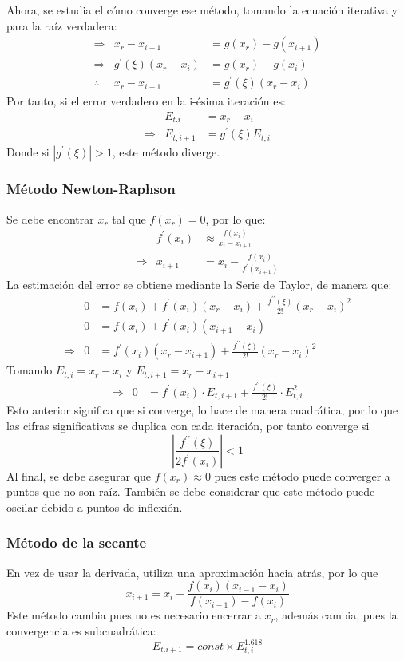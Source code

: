 \documentclass[letterpaper, 12pt, twoside]{article}
\begin{document}
	Ahora, se estudia el cómo converge ese método, tomando la ecuación iterativa y para la raíz verdadera:
	\begin{eqnarray*}
	\Rightarrow &x_r - x_{i+1} &= g(x_r)-g(x_{i+1})\\
	\Rightarrow &g^{\prime}(\xi)(x_r-x_i) &=g(x_r)-g(x_i) \\
	\therefore &x_r -x_{i+1} &= g^{\prime}(\xi)(x_r-x_i)
	\end{eqnarray*}
	Por tanto, si el error verdadero en la i-ésima iteración es:
	\begin{eqnarray*}
		& E_{t.i} &=  x_r-x_i\\
		\Rightarrow &E_{t,i+1} &=g^{\prime}(\xi)E_{t,i}
	\end{eqnarray*}
	Donde si $|g^{\prime}(\xi)|>1$, este método diverge.
	\subsubsection{Método Newton-Raphson}
	Se debe encontrar $x_r$ tal que $f(x_r)=0$, por lo que:
	\begin{eqnarray*}
		&f^{\prime}(x_i) &\approx \frac{f(x_i)}{x_i-x_{i+1}}\\
		\Rightarrow &x_{i+1} &= x_i - \frac{f(x_i)}{f^{\prime}(x_{i+1})}
	\end{eqnarray*}
	La estimación del error se obtiene mediante la Serie de Taylor, de manera que:
	\begin{eqnarray*}
		&0 &= f(x_i) + f^{\prime}(x_i)(x_r-x_i) + \frac{f^{\prime\prime}(\xi)}{2!}(x_r-x_i)^2\\
		&0 &= f(x_i) + f^{\prime}(x_i)(x_{i+1}-x_i)\\
		\Rightarrow &0 &= f^\prime(x_i)(x_r-x_{i+1})+ \frac{f^{\prime\prime}(\xi)}{2!}(x_r-x_i)^2
	\end{eqnarray*}
	Tomando $E_{t,i} = x_r-x_i$ y $E_{t,i+1}= x_r - x_{i+1}$
	\begin{eqnarray*}
		\Rightarrow &0 &= f^\prime(x_i)\cdot E_{t,i+1} + \frac{f^{\prime\prime}(\xi)}{2!}\cdot E_{t,i}^2
	\end{eqnarray*}
	Esto anterior significa que si converge, lo hace de manera cuadrática, por lo que las cifras significativas se duplica con cada iteración, por tanto converge si $$\left|\frac{f^{\prime\prime}(\xi)}{2f^\prime(x_i)}\right|<1$$
	Al final, se debe asegurar que $f(x_r)\approx 0$ pues este método puede converger a puntos que no son raíz. También se debe considerar que este método puede oscilar debido a puntos de inflexión.
	\subsubsection{Método de la secante}
	En vez de usar la derivada, utiliza una aproximación hacia atrás, por lo que $$x_{i+1}=x_i-\frac{f(x_i)(x_{i-1}-x_i)}{f(x_{i-1})-f(x_i)}$$ Este método cambia pues no es necesario encerrar a $x_r$, además cambia, pues la convergencia es subcuadrática: $$E_{t.i+1}=const \times E_{t,i}^{1.618}$$
\end{document}
